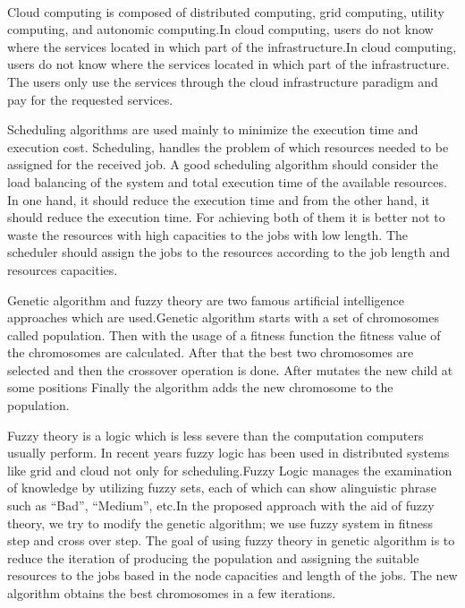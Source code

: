 \documentclass[a4paper,12pt]{report}
\begin{document}
\paragraph{}
{
	\linespread{1.5}
	
	Cloud computing is composed of distributed computing, grid computing, utility computing, and autonomic computing.In cloud computing, users do not know where the services located in which part of the infrastructure.In cloud computing, users do not know
	where the services located in which part of the infrastructure. The users only use the services through the cloud infrastructure paradigm and pay for the requested services.
	
	Scheduling algorithms are used mainly to minimize the execution time and execution cost. Scheduling, handles the problem of which resources needed to be assigned for
	the received job. A good scheduling algorithm should consider the load balancing of the system and total execution time of the available resources. In one hand, it should reduce the execution time and from the other hand, it should reduce the execution time.
	For achieving both of them it is better not to waste the resources with high capacities to the jobs with low length. The scheduler should assign the jobs to the resources according to the job length and resources capacities.
	
	
	Genetic algorithm and fuzzy theory are two famous artificial intelligence approaches which are used.Genetic
	algorithm starts with a set of chromosomes called population. Then with the usage of a fitness function the fitness value of the chromosomes are calculated. After that the best two chromosomes are selected and then the crossover operation is done. After mutates the new child at some positions Finally the algorithm adds the new chromosome to the population.
	
	Fuzzy theory is a logic which is less severe than the computation computers usually perform. In recent years fuzzy logic has been used in distributed systems like grid and cloud not only for scheduling.Fuzzy Logic manages the examination of
	knowledge by utilizing fuzzy sets, each of which can show alinguistic phrase such as “Bad”, “Medium”, etc.In the proposed approach with the aid of fuzzy theory, we try to modify the genetic
	algorithm; we use fuzzy system in fitness step and cross over step. The goal of using fuzzy theory in genetic algorithm is to reduce the iteration of producing the population and assigning the suitable resources to the jobs based in the node capacities and length of the jobs. The new algorithm obtains the best chromosomes in a few iterations.
	
}
\end{document}
